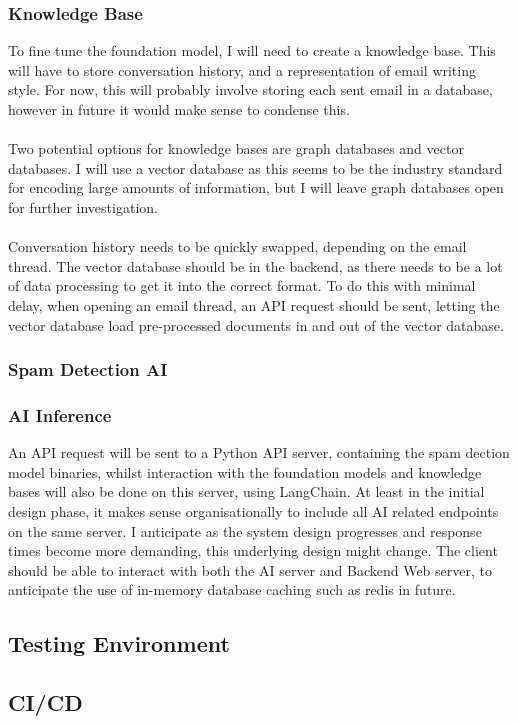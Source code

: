 \documentclass[../main.tex]{subfiles}
\begin{document}
\subsubsection{Knowledge Base}
To fine tune the foundation model, I will need to create a knowledge base. This will have to store conversation history, and a representation of email writing style. For now, this will probably involve storing each sent email in a database, however in future it would make sense to condense this.
\\\\
Two potential options for knowledge bases are graph databases and vector databases. I will use a vector database as this seems to be the industry standard for encoding large amounts of information, but I will leave graph databases open for further investigation.
\\\\
Conversation history needs to be quickly swapped, depending on the email thread. The vector database should be in the backend, as there needs to be a lot of data processing to get it into the correct format. To do this with minimal delay, when opening an email thread, an API request should be sent, letting the vector database load pre-processed documents in and out of the vector database.

\subsubsection{Spam Detection AI}

\subsubsection{AI Inference}
An API request will be sent to a Python API server, containing the spam dection model binaries, whilst interaction with the foundation models and knowledge bases will also be done on this server, using LangChain. At least in the initial design phase, it makes sense organisationally to include all AI related endpoints on the same server. I anticipate as the system design progresses and response times become more demanding, this underlying design might change. The client should be able to interact with both the AI server and Backend Web server, to anticipate the use of in-memory database caching such as redis in future.

\subsection{Testing Environment}

\subsection{CI/CD}
\end{document}
